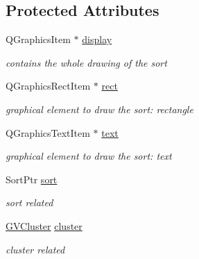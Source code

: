 \subsection*{\-Protected \-Attributes}
\begin{DoxyCompactItemize}
\item 
\hypertarget{class_g_sort_a024df14a4e06466591e01c23a5b80b57}{\-Q\-Graphics\-Item $\ast$ \hyperlink{class_g_sort_a024df14a4e06466591e01c23a5b80b57}{display}}\label{class_g_sort_a024df14a4e06466591e01c23a5b80b57}

\begin{DoxyCompactList}\small\item\em contains the whole drawing of the sort \end{DoxyCompactList}\item 
\hypertarget{class_g_sort_ae9555111be5199a489eda07da4f9963f}{\-Q\-Graphics\-Rect\-Item $\ast$ \hyperlink{class_g_sort_ae9555111be5199a489eda07da4f9963f}{rect}}\label{class_g_sort_ae9555111be5199a489eda07da4f9963f}

\begin{DoxyCompactList}\small\item\em graphical element to draw the sort\-: rectangle \end{DoxyCompactList}\item 
\hypertarget{class_g_sort_a17c4f8eafc9402f5393e69e614f5429a}{\-Q\-Graphics\-Text\-Item $\ast$ \hyperlink{class_g_sort_a17c4f8eafc9402f5393e69e614f5429a}{text}}\label{class_g_sort_a17c4f8eafc9402f5393e69e614f5429a}

\begin{DoxyCompactList}\small\item\em graphical element to draw the sort\-: text \end{DoxyCompactList}\item 
\hypertarget{class_g_sort_a8dea499c0b3fa30f9e9558a165a52030}{\-Sort\-Ptr \hyperlink{class_g_sort_a8dea499c0b3fa30f9e9558a165a52030}{sort}}\label{class_g_sort_a8dea499c0b3fa30f9e9558a165a52030}

\begin{DoxyCompactList}\small\item\em sort related \end{DoxyCompactList}\item 
\hypertarget{class_g_sort_aed2a99e461d0af9b2b323e1a9fda92fa}{\hyperlink{struct_g_v_cluster}{\-G\-V\-Cluster} \hyperlink{class_g_sort_aed2a99e461d0af9b2b323e1a9fda92fa}{cluster}}\label{class_g_sort_aed2a99e461d0af9b2b323e1a9fda92fa}

\begin{DoxyCompactList}\small\item\em cluster related \end{DoxyCompactList}\end{DoxyCompactItemize}
